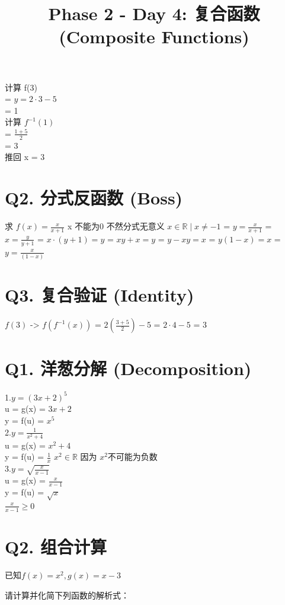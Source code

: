\documentclass[12pt]{article}
\begin{document}
计算 f(3)\\ 
= $y = 2 \cdot 3 - 5$\\
= 1\\
计算 $f^{-1}(1)$\\
= $\frac{1+5}{2}$\\
= 3 \\
推回 x = 3 \\

\section*{Q2. 分式反函数 (Boss)}
求 $f(x) = \frac{x}{x+1}$
x 不能为0 不然分式无意义 $x \in \mathbb{R} \mid x\neq-1$
= $y = \frac{x}{x+1}$
= $x = \frac{y}{y+1}$
= $x \cdot (y+ 1) = y$
= $xy + x = y$
= $y - xy = x$
= $y(1-x) = x$
= $y = \frac{x}{(1-x)}$

\section*{Q3. 复合验证 (Identity)}

$f(3)$ -> $f(f^{-1}(x))$
= $2(\frac{3+5}{2}) - 5$
= $2 \cdot 4 - 5$
= $3$


\title{Phase 2 - Day 4: 复合函数(Composite Functions)}


\section*{Q1. 洋葱分解 (Decomposition)}
1.$y = (3x+2)^{5}$\\
u = g(x) = $3x+2$\\
y = f(u) = $x^{5}$\\

2.$y= \frac{1}{x^{2}+4}$\\
u = g(x) = $x^{2}+4$\\
y = f(u) = $\frac{1}{x}$  $x^{2} \in \mathbb{R}$ 因为 $x^{2} 不可能为负数$\\

3.$y = \sqrt{\frac{x}{x-1}}$\\
u = g(x) = $\frac{x}{x-1}$\\
y = f(u) = $\sqrt{x}$\\   $\frac{x}{x-1} \geq 0 $


\section*{Q2. 组合计算}
已知$f(x)=x^{2}, g(x) = x-3$

请计算并化简下列函数的解析式：
\end{document}
